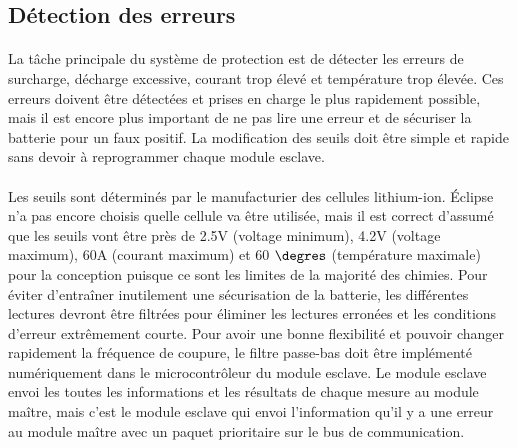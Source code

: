 
\subsection{Détection des erreurs}
	\paragraph*{}
	La tâche principale du système de protection est de détecter les erreurs de surcharge, décharge excessive, courant trop élevé et température trop élevée. Ces erreurs doivent être détectées et prises en charge le plus rapidement possible, mais il est encore plus important de ne pas lire une erreur et de sécuriser la batterie pour un faux positif. La modification des seuils doit être simple et rapide sans devoir à reprogrammer chaque module esclave. 

	\paragraph*{}
	Les seuils sont déterminés par le manufacturier des cellules lithium-ion. Éclipse n'a pas encore choisis quelle cellule va être utilisée, mais il est correct d'assumé que les seuils vont être près de 2.5V (voltage minimum), 4.2V (voltage maximum), 60A (courant maximum) et 60 $\degres$ (température maximale) pour la conception puisque ce sont les limites de la majorité des chimies. Pour éviter d'entraîner inutilement une sécurisation de la batterie, les différentes lectures devront être filtrées pour éliminer les lectures erronées et les conditions d'erreur extrêmement courte. Pour avoir une bonne flexibilité et pouvoir changer rapidement la fréquence de coupure, le filtre passe-bas doit être implémenté numériquement dans le microcontrôleur du module esclave. Le module esclave envoi les toutes les informations et les résultats de chaque mesure au module maître, mais c'est le module esclave qui envoi l'information qu'il y a une erreur au module maître avec un paquet prioritaire sur le bus de communication.
 